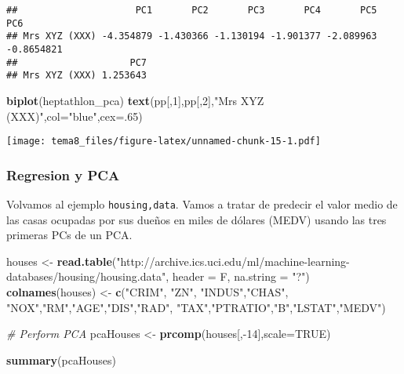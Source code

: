 \documentclass[]{article}
\newenvironment{Shaded}{\begin{snugshade}}{\end{snugshade}}
\newcommand{\KeywordTok}[1]{\textcolor[rgb]{0.13,0.29,0.53}{\textbf{{#1}}}}
\newcommand{\DataTypeTok}[1]{\textcolor[rgb]{0.13,0.29,0.53}{{#1}}}
\newcommand{\DecValTok}[1]{\textcolor[rgb]{0.00,0.00,0.81}{{#1}}}
\newcommand{\StringTok}[1]{\textcolor[rgb]{0.31,0.60,0.02}{{#1}}}
\newcommand{\CommentTok}[1]{\textcolor[rgb]{0.56,0.35,0.01}{\textit{{#1}}}}
\newcommand{\OtherTok}[1]{\textcolor[rgb]{0.56,0.35,0.01}{{#1}}}
\newcommand{\NormalTok}[1]{{#1}}
\numberwithin{equation}{section}
\begin{document}
\begin{verbatim}
##                     PC1       PC2       PC3       PC4       PC5        PC6
## Mrs XYZ (XXX) -4.354879 -1.430366 -1.130194 -1.901377 -2.089963 -0.8654821
##                    PC7
## Mrs XYZ (XXX) 1.253643
\end{verbatim}

\begin{Shaded}
\begin{Highlighting}[]
\KeywordTok{biplot}\NormalTok{(heptathlon_pca)}
\KeywordTok{text}\NormalTok{(pp[,}\DecValTok{1}\NormalTok{],pp[,}\DecValTok{2}\NormalTok{],}\StringTok{"Mrs XYZ (XXX)"}\NormalTok{,}\DataTypeTok{col=}\StringTok{"blue"}\NormalTok{,}\DataTypeTok{cex=}\NormalTok{.}\DecValTok{65}\NormalTok{)}
\end{Highlighting}
\end{Shaded}

\texttt{[image: tema8\_files/figure-latex/unnamed-chunk-15-1.pdf]}

\subsubsection{Regresion y PCA}\label{regresion-y-pca}

Volvamos al ejemplo \texttt{housing,data}. Vamos a tratar de predecir el
valor medio de las casas ocupadas por sus dueños en miles de dólares
(MEDV) usando las tres primeras PCs de un PCA.

\begin{Shaded}
\begin{Highlighting}[]
\NormalTok{houses <-}\StringTok{ }\KeywordTok{read.table}\NormalTok{(}\StringTok{"http://archive.ics.uci.edu/ml/machine-learning-databases/housing/housing.data"}\NormalTok{,}
                     \DataTypeTok{header =} \NormalTok{F, }\DataTypeTok{na.string =} \StringTok{"?"}\NormalTok{)}
\KeywordTok{colnames}\NormalTok{(houses) <-}\StringTok{ }\KeywordTok{c}\NormalTok{(}\StringTok{"CRIM"}\NormalTok{, }\StringTok{"ZN"}\NormalTok{, }\StringTok{"INDUS"}\NormalTok{,}\StringTok{"CHAS"}\NormalTok{,}
                      \StringTok{"NOX"}\NormalTok{,}\StringTok{"RM"}\NormalTok{,}\StringTok{"AGE"}\NormalTok{,}\StringTok{"DIS"}\NormalTok{,}\StringTok{"RAD"}\NormalTok{,}
                      \StringTok{"TAX"}\NormalTok{,}\StringTok{"PTRATIO"}\NormalTok{,}\StringTok{"B"}\NormalTok{,}\StringTok{"LSTAT"}\NormalTok{,}\StringTok{"MEDV"}\NormalTok{)}

\CommentTok{# Perform PCA}
\NormalTok{pcaHouses <-}\StringTok{ }\KeywordTok{prcomp}\NormalTok{(houses[,-}\DecValTok{14}\NormalTok{],}\DataTypeTok{scale=}\OtherTok{TRUE}\NormalTok{)}

\KeywordTok{summary}\NormalTok{(pcaHouses)}
\end{Highlighting}
\end{Shaded}
\end{document}
